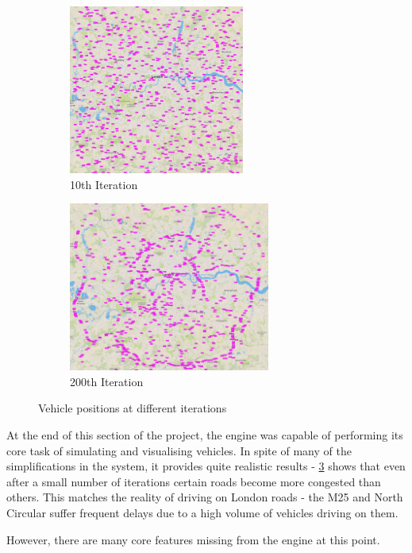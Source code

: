 \documentclass[ %
                    author={Alexander Hill},
                supervisor={Dr. Benjamin Sach},
                    degree={MEng},
                     title={MARMOSET},
                  subtitle={Multi-Agent Route Management using Online Simulation for Efficient Transportation},
                      type={research},
                      year={2016} ]{dissertation}
\begin{document}
\begin{figure}[h]
\centering
\begin{subfigure}[b]{0.4\textwidth}
    \centering
    \includegraphics[height=15em]{init-start}
    \caption{10th Iteration}\label{fig:init-start}
\end{subfigure}
\hspace{2em}
\begin{subfigure}[b]{0.4\textwidth}
    \centering
    \includegraphics[height=15em]{init-200}
    \caption{200th Iteration}\label{fig:init-200}
\end{subfigure}
\caption{Vehicle positions at different iterations}
\end{figure}

At the end of this section of the project, the engine was capable of performing
its core task of simulating and visualising vehicles. In spite of many of the
simplifications in the system, it provides quite realistic results -
\ref{fig:init-200} shows that even after a small number of iterations certain
roads become more congested than others. This matches the reality of driving on
London roads - the M25 and North Circular suffer frequent delays due to a high
volume of vehicles driving on them.

However, there are many core features missing from the engine at this point.
\end{document}
